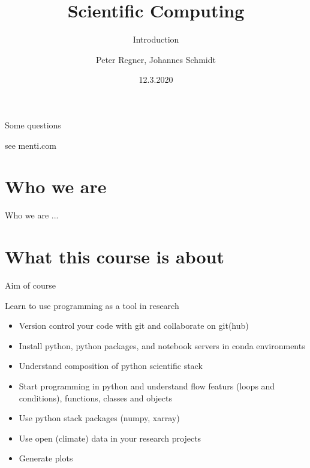 \documentclass[10pt,color=usenames,dvipsnames]{beamer}
\title[Scientific Computing]{Scientific Computing}
\subtitle{Introduction}
\author{Peter Regner, Johannes Schmidt}
\institute{Institute for Sustainable Economic Development, BOKU, Wien}
\date{12.3.2020}
\begin{document}
\begin{frame}
\vspace{2cm}
\maketitle

\end{frame}

\begin{frame}{Some questions}

see menti.com

\end{frame}

\begin{frame}
	
	\tableofcontents
	
\end{frame}

\section{Who we are}

\begin{frame}{Who we are}
...	
\end{frame}

\section{What this course is about}

\begin{frame}{Aim of course}
	
	Learn to use programming as a tool in research
	
	\begin{itemize}
		\item Version control your code with git and collaborate on git(hub)
		\item Install python, python packages, and notebook servers in conda environments
		\item Understand composition of python scientific stack
		\item Start programming in python and understand flow featurs (loops and conditions), functions, classes and objects
		\item Use python stack packages (numpy, xarray)
		\item Use open (climate) data in your research projects
		\item Generate plots
	\end{itemize}
	
\end{frame}
\end{document}
